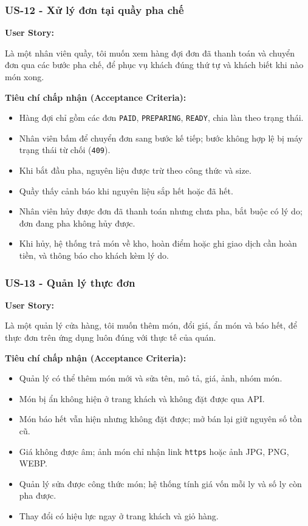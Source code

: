 \documentclass[12pt,a4paper]{article}
\newcommand{\userstory}[2]{%
  \noindent\textbf{User Story:}\par
  #1\par
  \hspace*{\parindent}\textbf{Tiêu chí chấp nhận (Acceptance Criteria):}
  \begin{itemize}
    #2
  \end{itemize}}
\begin{document}
\subsubsection{US-12 - Xử lý đơn tại quầy pha chế}
\userstory{Là một nhân viên quầy, tôi muốn xem hàng đợi đơn đã thanh toán và chuyển đơn qua các bước pha chế, để phục vụ khách đúng thứ tự và khách biết khi nào món xong.}{
  \item Hàng đợi chỉ gồm các đơn \texttt{PAID}, \texttt{PREPARING}, \texttt{READY}, chia làn theo trạng thái.
  \item Nhân viên bấm để chuyển đơn sang bước kế tiếp; bước không hợp lệ bị máy trạng thái từ chối (\texttt{409}).
  \item Khi bắt đầu pha, nguyên liệu được trừ theo công thức và size.
  \item Quầy thấy cảnh báo khi nguyên liệu sắp hết hoặc đã hết.
  \item Nhân viên hủy được đơn đã thanh toán nhưng chưa pha, bắt buộc có lý do; đơn đang pha không hủy được.
  \item Khi hủy, hệ thống trả món về kho, hoàn điểm hoặc ghi giao dịch cần hoàn tiền, và thông báo cho khách kèm lý do.
}

\subsubsection{US-13 - Quản lý thực đơn}
\userstory{Là một quản lý cửa hàng, tôi muốn thêm món, đổi giá, ẩn món và báo hết, để thực đơn trên ứng dụng luôn đúng với thực tế của quán.}{
  \item Quản lý có thể thêm món mới và sửa tên, mô tả, giá, ảnh, nhóm món.
  \item Món bị ẩn không hiện ở trang khách và không đặt được qua API.
  \item Món báo hết vẫn hiện nhưng không đặt được; mở bán lại giữ nguyên số tồn cũ.
  \item Giá không được âm; ảnh món chỉ nhận link \texttt{https} hoặc ảnh JPG, PNG, WEBP.
  \item Quản lý sửa được công thức món; hệ thống tính giá vốn mỗi ly và số ly còn pha được.
  \item Thay đổi có hiệu lực ngay ở trang khách và giỏ hàng.
}
\end{document}
